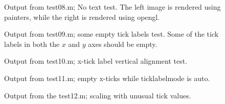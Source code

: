 \documentclass[a4paper,11pt]{article}
\begin{document}
     \begin{figure}[ht]
       \centering
       \quad
       \caption{Output from {\ttfamily test08.m}; No text test. The left image is rendered using
       painters, while the right is rendered using opengl.}
     \end{figure}
     \begin{figure}
       \centering
       \caption{Output from {\ttfamily test09.m}; some empty tick labels test. Some of the tick labels
       in both the $x$ and $y$ axes should be empty.}
     \end{figure}
     \begin{figure}
       \centering
       \caption{Output from {\ttfamily test10.m}; x-tick label vertical alignment test.}
     \end{figure}
     \begin{figure}
       \centering
       \caption{Output from {\ttfamily test11.m}; empty x-ticks while {\ttfamily ticklabelmode}
       is {\ttfamily auto}.}
     \end{figure}
     \begin{figure}[ht]
       \centering
       \caption{Output from the {\ttfamily test12.m}; scaling with unusual tick values.}
     \end{figure}
\end{document}

